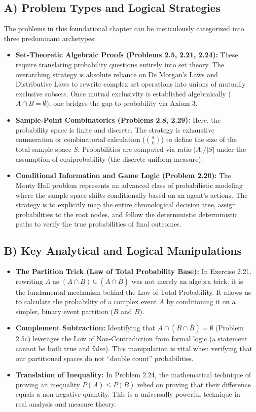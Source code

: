 \documentclass[12pt]{article}
\begin{document}
\subsection{A) Problem Types and Logical Strategies}
The problems in this foundational chapter can be meticulously categorized into three predominant archetypes:
\begin{itemize}
    \item \textbf{Set-Theoretic Algebraic Proofs (Problems 2.5, 2.21, 2.24):} These require translating probability questions entirely into set theory. The overarching strategy is absolute reliance on De Morgan's Laws and Distributive Laws to rewrite complex set operations into unions of mutually exclusive subsets. Once mutual exclusivity is established algebraically ($A \cap B = \emptyset$), one bridges the gap to probability via Axiom 3.
    \item \textbf{Sample-Point Combinatorics (Problems 2.8, 2.29):} Here, the probability space is finite and discrete. The strategy is exhaustive enumeration or combinatorial calculation ($\binom{n}{k}$) to define the size of the total sample space $S$. Probabilities are computed via ratio $|A|/|S|$ under the assumption of equiprobability (the discrete uniform measure).
    \item \textbf{Conditional Information and Game Logic (Problem 2.20):} The Monty Hall problem represents an advanced class of probabilistic modeling where the sample space shifts conditionally based on an agent's actions. The strategy is to explicitly map the entire chronological decision tree, assign probabilities to the root nodes, and follow the deterministic deterministic paths to verify the true probabilities of final outcomes.
\end{itemize}

\subsection{B) Key Analytical and Logical Manipulations}
\begin{itemize}
    \item \textbf{The Partition Trick (Law of Total Probability Base):} In Exercise 2.21, rewriting $A$ as $(A \cap B) \cup (A \cap \overline{B})$ was not merely an algebra trick; it is the fundamental mechanism behind the Law of Total Probability. It allows us to calculate the probability of a complex event $A$ by conditioning it on a simpler, binary event partition ($B$ and $\overline{B}$).
    \item \textbf{Complement Subtraction:} Identifying that $A \cap (B \cap \overline{B}) = \emptyset$ (Problem 2.5c) leverages the Law of Non-Contradiction from formal logic (a statement cannot be both true and false). This manipulation is vital when verifying that our partitioned spaces do not ``double count'' probabilities.
    \item \textbf{Translation of Inequality:} In Problem 2.24, the mathematical technique of proving an inequality $P(A) \leq P(B)$ relied on proving that their difference equals a non-negative quantity. This is a universally powerful technique in real analysis and measure theory. 
\end{itemize}
\end{document}
